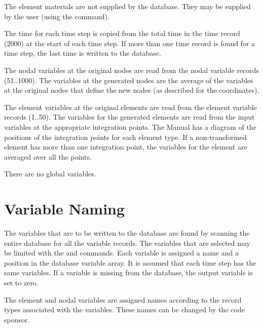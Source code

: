 The element materials are not supplied by the  database.
They may be supplied by the user (using the  command).

The time for each time step is copied from the total time in the
 time record (2000) at the start of each time step. If more
than one time record is found for a time step, the last time is written
to the database.

The nodal variables at the original nodes are read from the
 nodal variable records (51..1000). The variables at the
generated nodes are the average of the variables at the original nodes
that define the new nodes (as described for the coordinates).

The element variables at the original elements are read from the
 element variable records (1..50). The variables for the
generated elements are read from the input variables at the appropriate
integration points. The  Manual has a diagram of the
positions of the integration points for each element type. If a
non-transformed element has more than one integration point, the
variables for the element are averaged over all the points.

There are no global variables.

\section{Variable Naming} \label{abasea:varnam}

The variables that are to be written to the  database are
found by scanning the entire  database for all the variable
records. The variables that are selected may be limited with the
 and  commands. Each variable is assigned a name
and a position in the  database variable array. It is
assumed that each time step has the same variables. If a variable is
missing from the  database, the output variable is set to
zero.

The element and nodal variables are assigned names according to the
record types associated with the variables. These names can be changed
by the code sponsor.

